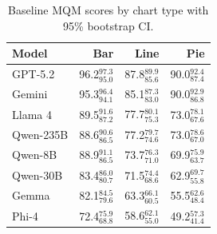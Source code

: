 \begin{table}[h]
\centering
\small
\begin{tabular}{@{}lrrr@{}}
\toprule
\textbf{Model} & \textbf{Bar} & \textbf{Line} & \textbf{Pie} \\
\midrule
GPT-5.2 & 96.2$_{\scriptstyle 95.0}^{\scriptstyle 97.3}$ & 87.8$_{\scriptstyle 85.6}^{\scriptstyle 89.9}$ & 90.0$_{\scriptstyle 87.4}^{\scriptstyle 92.4}$ \\
Gemini & 95.3$_{\scriptstyle 94.1}^{\scriptstyle 96.4}$ & 85.1$_{\scriptstyle 83.0}^{\scriptstyle 87.3}$ & 90.0$_{\scriptstyle 86.8}^{\scriptstyle 92.9}$ \\
Llama 4 & 89.5$_{\scriptstyle 87.2}^{\scriptstyle 91.6}$ & 77.7$_{\scriptstyle 75.3}^{\scriptstyle 80.1}$ & 73.0$_{\scriptstyle 67.6}^{\scriptstyle 78.1}$ \\
Qwen-235B & 88.6$_{\scriptstyle 86.5}^{\scriptstyle 90.6}$ & 77.2$_{\scriptstyle 74.6}^{\scriptstyle 79.7}$ & 73.0$_{\scriptstyle 67.0}^{\scriptstyle 78.6}$ \\
Qwen-8B & 88.9$_{\scriptstyle 86.5}^{\scriptstyle 91.1}$ & 73.7$_{\scriptstyle 71.0}^{\scriptstyle 76.3}$ & 69.9$_{\scriptstyle 63.7}^{\scriptstyle 75.9}$ \\
Qwen-30B & 83.4$_{\scriptstyle 80.7}^{\scriptstyle 86.0}$ & 71.5$_{\scriptstyle 68.6}^{\scriptstyle 74.4}$ & 62.9$_{\scriptstyle 55.8}^{\scriptstyle 69.7}$ \\
Gemma & 82.1$_{\scriptstyle 79.6}^{\scriptstyle 84.5}$ & 63.3$_{\scriptstyle 60.5}^{\scriptstyle 66.1}$ & 55.5$_{\scriptstyle 48.4}^{\scriptstyle 62.6}$ \\
Phi-4 & 72.4$_{\scriptstyle 68.8}^{\scriptstyle 75.9}$ & 58.6$_{\scriptstyle 55.0}^{\scriptstyle 62.1}$ & 49.2$_{\scriptstyle 41.4}^{\scriptstyle 57.3}$ \\
\bottomrule
\end{tabular}
\caption{Baseline MQM scores by chart type with 95\% bootstrap CI.}
\label{tab:mqm-chart-type}
\end{table}
